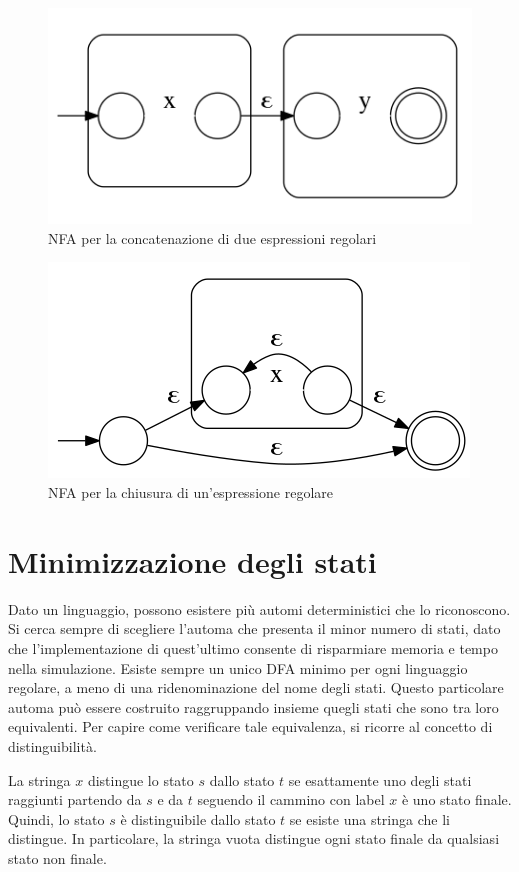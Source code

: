 \begin{figure}[htbp]
\centering
\includegraphics[scale=0.4]{./Img/automi/re_concat.png}
\caption{NFA per la concatenazione di due espressioni regolari}
\label{fig:re_concat}
\end{figure}

\begin{figure}[htbp]
\centering
\includegraphics[scale=0.4]{./Img/automi/re_closure.png}
\caption{NFA per la chiusura di un'espressione regolare}
\label{fig:re_closure}
\end{figure}


\section{Minimizzazione degli stati}
Dato un linguaggio, possono esistere più automi deterministici che lo riconoscono. Si cerca sempre di scegliere l'automa che presenta il minor numero di stati, dato che l'implementazione di quest'ultimo consente di risparmiare memoria e tempo nella simulazione. 
Esiste sempre un unico DFA minimo per ogni linguaggio regolare, a meno di una ridenominazione del nome degli stati. Questo particolare automa può essere costruito raggruppando insieme quegli stati che sono tra loro equivalenti. Per capire come verificare tale equivalenza, si ricorre al concetto di distinguibilità.
\begin{defn}
La stringa $x$ distingue lo stato $s$ dallo stato $t$ se esattamente uno degli stati raggiunti partendo da $s$ e da $t$ seguendo il cammino con label $x$ è uno stato finale. Quindi, lo stato $s$ è distinguibile dallo stato $t$ se esiste una stringa che li distingue.
In particolare, la stringa vuota distingue ogni stato finale da qualsiasi stato non finale.
\end{defn}

